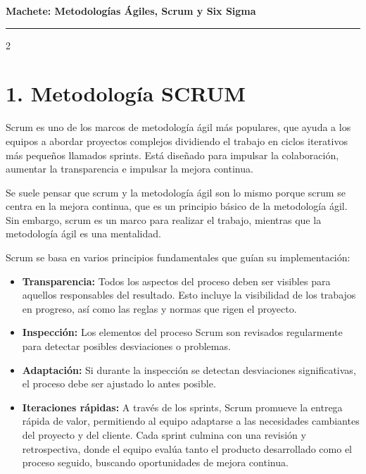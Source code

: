 \documentclass[10pt,a4paper]{article}
\begin{document}
\begin{center}
    \textbf{\Large Machete: Metodologías Ágiles, Scrum y Six Sigma}
\end{center}
\vspace{-0.5cm}
\rule{\textwidth}{0.4pt}
\vspace{0.2cm}

\begin{multicols}{2}

\section*{1. Metodología SCRUM}
Scrum es uno de los marcos de metodología ágil más populares, que ayuda a los equipos a abordar proyectos complejos dividiendo el trabajo en ciclos iterativos más pequeños llamados sprints. Está diseñado para impulsar la colaboración, aumentar la transparencia e impulsar la mejora continua.

Se suele pensar que scrum y la metodología ágil son lo mismo porque scrum se centra en la mejora continua, que es un principio básico de la metodología ágil. Sin embargo, scrum es un marco para realizar el trabajo, mientras que la metodología ágil es una mentalidad. 

Scrum se basa en varios principios fundamentales que guían su implementación:

\begin{itemize}[leftmargin=*, noitemsep, topsep=0pt]
    \item \textbf{Transparencia:} Todos los aspectos del proceso deben ser visibles para aquellos responsables del resultado. Esto incluye la visibilidad de los trabajos en progreso, así como las reglas y normas que rigen el proyecto.
    \item \textbf{Inspección:} Los elementos del proceso Scrum son revisados regularmente para detectar posibles desviaciones o problemas.
    \item \textbf{Adaptación:} Si durante la inspección se detectan desviaciones significativas, el proceso debe ser ajustado lo antes posible.
    \item \textbf{Iteraciones rápidas:} A través de los sprints, Scrum promueve la entrega rápida de valor, permitiendo al equipo adaptarse a las necesidades cambiantes del proyecto y del cliente. Cada sprint culmina con una revisión y retrospectiva, donde el equipo evalúa tanto el producto desarrollado como el proceso seguido, buscando oportunidades de mejora continua.
\end{itemize}


\end{multicols}
\end{document}
